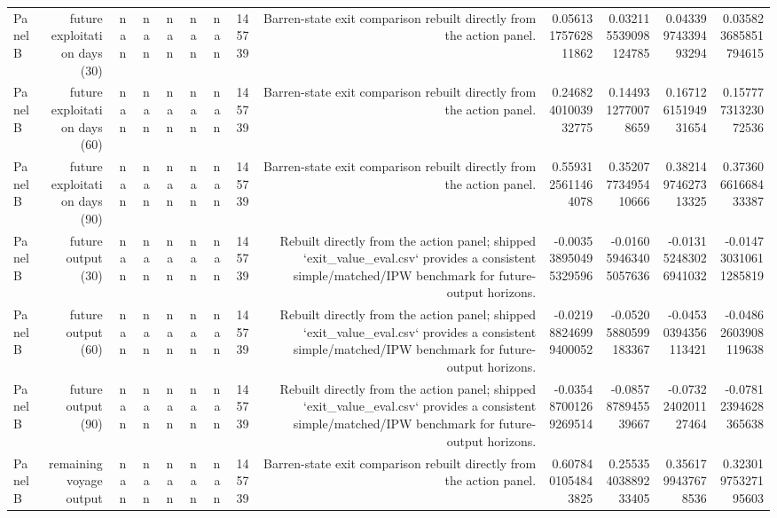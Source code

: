 \documentclass{article}
\begin{document}
\begin{tabular}{lrrrrrrrrrrrr}
Panel B & future exploitation days (30) & nan & nan & nan & nan & nan & 145739 & Barren-state exit comparison rebuilt directly from the action panel. & 0.05613175762811862 & 0.032115539098124785 & 0.04339974339493294 & 0.035823685851794615 \\
Panel B & future exploitation days (60) & nan & nan & nan & nan & nan & 145739 & Barren-state exit comparison rebuilt directly from the action panel. & 0.24682401003932775 & 0.1449312770078659 & 0.16712615194931654 & 0.15777731323072536 \\
Panel B & future exploitation days (90) & nan & nan & nan & nan & nan & 145739 & Barren-state exit comparison rebuilt directly from the action panel. & 0.5593125611464078 & 0.35207773495410666 & 0.38214974627313325 & 0.37360661668433387 \\
Panel B & future output (30) & nan & nan & nan & nan & nan & 145739 & Rebuilt directly from the action panel; shipped `exit\_value\_eval.csv` provides a consistent simple/matched/IPW benchmark for future-output horizons. & -0.003538950495329596 & -0.016059463405057636 & -0.013152483026941032 & -0.014730310611285819 \\
Panel B & future output (60) & nan & nan & nan & nan & nan & 145739 & Rebuilt directly from the action panel; shipped `exit\_value\_eval.csv` provides a consistent simple/matched/IPW benchmark for future-output horizons. & -0.021988246999400052 & -0.05205880599183367 & -0.04530394356113421 & -0.04862603908119638 \\
Panel B & future output (90) & nan & nan & nan & nan & nan & 145739 & Rebuilt directly from the action panel; shipped `exit\_value\_eval.csv` provides a consistent simple/matched/IPW benchmark for future-output horizons. & -0.035487001269269514 & -0.0857878945539667 & -0.0732240201127464 & -0.07812394628365638 \\
Panel B & remaining voyage output & nan & nan & nan & nan & nan & 145739 & Barren-state exit comparison rebuilt directly from the action panel. & 0.6078401054843825 & 0.25535403889233405 & 0.3561799437678536 & 0.32301975327195603 \\
\hline
\end{tabular}
\end{document}
